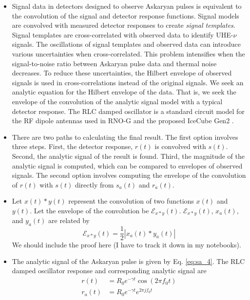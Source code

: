 \documentclass[amsmath,amssymb,aps,prd,10pt,twocolumn,showkeys]{revtex4}
\begin{document}
\begin{itemize}
\item Signal data in detectors designed to observe Askaryan pulses is equivalent to the convolution of the signal and detector response functions.  Signal models are convolved with measured detector responses to create \textit{signal templates}.  Signal templates are cross-correlated with observed data to identify UHE-$\nu$ signals.  The oscillations of signal templates and observed data can introduce various uncertainties when cross-correlated.  This problem intensifies when the signal-to-noise ratio between Askaryan pulse data and thermal noise decreases.  To reduce these uncertainties, the Hilbert envelope of observed signals is used in cross-correlations instead of the original signals.  We seek an analytic equation for the Hilbert envelope of the data.  That is, we seek the envelope of the convolution of the analytic signal model with a typical detector response.  The RLC damped oscillator is a standard circuit model for the RF dipole antennas used in RNO-G and the proposed IceCube Gen2 \cite{10.1103/PhysRevD.85.062004,10.1088/1748-0221/16/03/p03025,10.48550/arxiv.2008.04323}.
\item There are two paths to calculating the final result.  The first option involves three steps.  First, the detector response, $r(t)$ is convolved with $s(t)$.  Second, the analytic signal of the result is found.  Third, the magnitude of the analytic signal is computed, which can be compared to envelopes of observed signals.  The second option involves computing the envelope of the convolution of $r(t)$ with $s(t)$ directly from $s_a(t)$ and $r_a(t)$.
\item Let $x(t) * y(t)$ represent the convolution of two functions $x(t)$ and $y(t)$.  Let the envelope of the convolution be $\mathcal{E}_{x * y}(t)$.  $\mathcal{E}_{x * y}(t)$, $x_a(t)$, and $y_a(t)$ are related by
\begin{equation}
\mathcal{E}_{x * y}(t) = \frac{1}{2}| x_a (t) * y_a(t)| \label{eq:awesome}
\end{equation}
We should include the proof here (I have to track it down in my notebooks).
\item The analytic signal of the Askaryan pulse is given by Eq. \ref{eq:sa_4}.  The RLC damped oscillator response and corresponding analytic signal are
\begin{align}
r(t) &= R_0 e^{-\gamma t} \cos(2\pi f_0 t) \\
r_a(t) &= R_0 e^{-\gamma t} e^{2\pi j f_0 t} \label{eq:ra}
\end{align}

\end{itemize}
\end{document}
